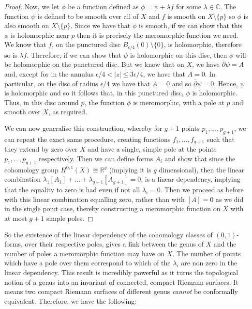 \documentclass[11pt]{report}
\theoremstyle{definition}
\begin{document}
\begin{proof}
  Now, we let $\phi$ be a function defined as $\phi = \psi + \lambda f$ for some $\lambda \in \mathbb{C}$. The function $\psi$ is defined to be smooth over all of $X$ and $f$ is smooth on $X\setminus \{p\}$ so $\phi$ is also smooth on $X \setminus \{p\}$. Since we have that $\phi$ is smooth, if we can show that this $\phi$ is holomorphic near $p$ then it is precisely the meromorphic function we need. We know that $f$, on the punctured disc $\overline{B_{\epsilon/4}(0)} \setminus \{0\}$, is holomorphic, therefore so is $\lambda f$. Therefore, if we can show that $\psi$ is holomorphic on this disc, then $\phi$ will be holomorphic on the punctured disc. But we know that on $X$, we have $\overline{\partial}\psi = A$ and, except for in the annulus $\epsilon / 4 < |z| \leq 3\epsilon / 4$, we have that $A=0$. In particular, on the disc of radius $\epsilon / 4$ we have that $A=0$ and so $\overline{\partial}\psi = 0$. Hence, $\psi$ is holomorphic and so it follows that, in this punctured disc, $\phi$ is holomorphic. Thus, in this disc around $p$, the function $\phi$ is meromorphic, with a pole at $p$ and smooth over $X$, as required.

  We can now generalise this construction, whereby for $g+1$ points $p_1,\ldots, p_{g+1}$, we can repeat the exact same procedure, creating functions $f_1,\ldots,f_{g+1}$ such that they extend by zero over $X$ and have a single, simple pole at the points $p_1,\ldots,p_{g+1}$ respectively. Then we can define forms $A_i$ and show that since the cohomology group $H^{0,1}(X) \cong \mathbb{R}^g$ (implying it is $g$ dimensional), then the linear combination $\lambda_1[A_1]+\ldots+\lambda_{g+1}[A_{g+1}] = 0$, is a linear dependency, implying that the equality to zero is had even if not all $\lambda_i = 0$. Then we proceed as before with this linear combination equalling zero, rather than with $[A]=0$ as we did in the single point case, thereby constructing a meromorphic function on $X$ with at most $g+1$ simple poles. 
\end{proof}
So the existence of the linear dependency of the cohomology classes of $(0,1)$-forms, over their respective poles, gives a link between the genus of $X$ and the number of poles a meromorphic function may have on $X$. The number of points which have a pole over them correspond to which of the $\lambda_i$ are non zero in the linear dependency. This result is incredibly powerful as it turns the topological notion of a genus into an invariant of connected, compact Riemann surfaces. It means two compact Riemann surfaces of different genus \emph{cannot} be conformally equivalent. Therefore, we have the following:
\end{document}
